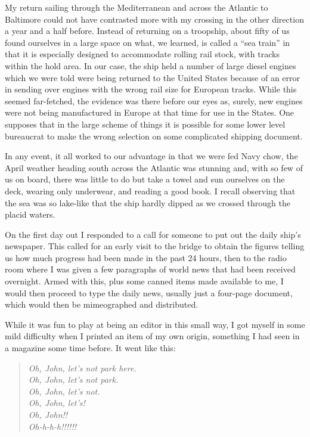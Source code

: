 \documentclass[../m3y]{subfiles}
\begin{document}
My return sailing through the Mediterranean and across the Atlantic to Baltimore could not have contrasted more with my crossing in the other direction a year and a half before. Instead of returning on a troopship, about fifty of us found ourselves in a large space on what, we learned, is called a ``sea train'' in that it is especially designed to accommodate rolling rail stock, with tracks within the hold area. In our case, the ship held a number of large diesel engines which we were told were being returned to the United States because of an error in sending over engines with the wrong rail size for European tracks. While this seemed far-fetched, the evidence was there before our eyes as, surely, new engines were not being manufactured in Europe at that time for use in the States. One supposes that in the large scheme of things it is possible for some lower level bureaucrat to make the wrong selection on some complicated shipping document.

In any event, it all worked to our advantage in that we were fed Navy chow, the April weather heading south across the Atlantic was stunning and, with so few of us on board, there was little to do but take a towel and sun ourselves on the deck, wearing only underwear, and reading a good book. I recall observing that the sea was so lake-like that the ship hardly dipped as we crossed through the placid waters.

On the first day out I responded to a call for someone to put out the daily ship's newspaper. This called for an early visit to the bridge to obtain the figures telling us how much progress had been made in the past 24 hours, then to the radio room where I was given a few paragraphs of world news that had been received overnight. Armed with this, plus some canned items made available to me, I would then proceed to type the daily news, usually just a four-page document, which would then be mimeographed and distributed.

While it was fun to play at being an editor in this small way, I got myself in some mild difficulty when I printed an item of my own origin, something I had seen in a magazine some time before. It went like this:

\begin{quote}
\emph{Oh, John, let's not park here.\\
Oh, John, let's not park.\\
Oh, John, let's not.\\
Oh, John, let's!\\
Oh, John!!\\
Oh-h-h-h!!!!!!
}
\end{quote}
\end{document}
